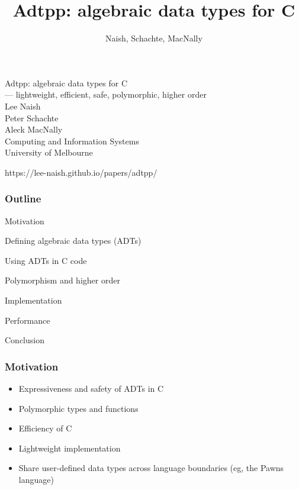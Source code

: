 \documentclass[t,t]{beamer}
\title{Adtpp: algebraic data types for C}
\author{Naish, Schachte, MacNally}
\begin{document}
\newcommand{\adtpp}{\texttt{adtpp}}
\newcommand{\Adtpp}{\texttt{Adtpp}}

\begin{frame}
\begin{center}
{\large Adtpp: algebraic data types for C\\
--- lightweight, efficient, safe, polymorphic, higher order
}\\[2cm]
Lee Naish\\
Peter Schachte\\
Aleck MacNally\\
Computing and Information Systems\\
University of Melbourne\\[2cm]
\end{center}

\large
{https://lee-naish.github.io/papers/adtpp/}

\end{frame}

\begin{frame}
\frametitle{Outline}
Motivation

Defining algebraic data types (ADTs)

Using ADTs in C code

Polymorphism and higher order

Implementation

Performance

Conclusion
\end{frame}

\begin{frame}
\frametitle{Motivation}
\begin{itemize}
\item Expressiveness and safety of ADTs in C
\item Polymorphic types and functions
\item Efficiency of C
\item Lightweight implementation
\item Share user-defined data types across language boundaries (eg,
the Pawns language)
\end{itemize}
\end{frame}
\end{document}
